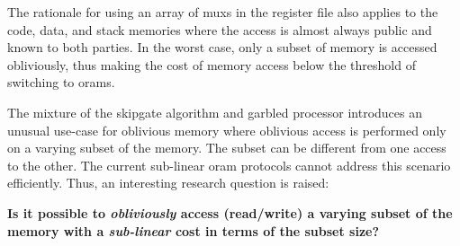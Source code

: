 The rationale for using an array of \acrshort{mux}s in the register file also applies to the code, data, and stack memories where the access is almost always public and known to both parties.
In the worst case, only a subset of memory is accessed obliviously, thus making the cost of memory access below the threshold of switching to \acrshort{oram}s.

The mixture of the \gls{skipgate} algorithm and garbled processor introduces an unusual use-case for oblivious memory where oblivious access is performed only on a varying subset of the memory.
The subset can be different from one access to the other.
The current sub-linear \acrshort{oram} protocols cannot address this scenario efficiently.
Thus, an interesting research question is raised:

\textbf{Is it possible to \textit{obliviously} access (read/write) a varying subset of the memory with a \textit{sub-linear} cost in terms of the subset size?}
